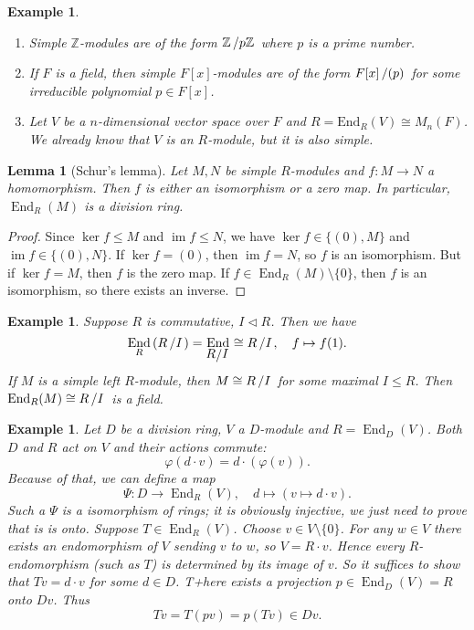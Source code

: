 \documentclass[10pt, a4paper]{article}
\newtheorem{example}[thm]{Example}
\newtheorem{lemma}[thm]{Lemma}
\newenvironment{noticeC}{%
  \tcolorbox[%
  notitle,
  empty,
  enhanced,  %
  breakable,
  coltext=black, 
  fontupper=\rmfamily,
  noparskip,
  sharp corners,
  boxrule=-1pt,  %
  frame hidden,
  left=7pt,  %
  right=7pt,
  top=5pt,
  bottom=5pt,
  before skip=2.5ex plus 2pt,
  after skip=2.5ex plus 2pt,
  overlay unbroken and last={%
  },
  ]}
{\endtcolorbox}
\newenvironment{myproof}%
  {\begin{noticeC}\begin{proof}}%
  {\end{proof}\end{noticeC}}
\newcommand{\Z}{\mathbb {Z}}
\newcommand{\quot}[2]{{\raisebox{0em}{$#1$}\left/\raisebox{0em}{$#2$}\right.}}
\DeclareMathOperator{\im}{im}
\DeclareMathOperator{\en}{End}
\begin{document}
\begin{example}
  \begin{enumerate}
    \item Simple $\Z$-modules are of the form $\quot{\Z}{p\Z}$ where $p$ is a prime number.
    \item If $F$ is a field, then simple $F[x]$-modules are of the form $\quot{F[x]}{(p)}$
    for some irreducible polynomial $p \in F[x]$.
    \item Let $V$ be a $n$-dimensional vector space over $F$ and $R = \mathrm{End}_R (V) \cong M_n (F)$.
    We already know that $V$ is an $R$-module, but it is also simple.
  \end{enumerate}

\end{example}

\begin{lemma}[Schur's lemma]
  Let $M, N$ be simple $R$-modules and $f: M \to N$ a homomorphism. Then $f$ is either an isomorphism or a zero map.
  In particular, $\en_R (M)$ is a division ring.
\end{lemma}

\begin{myproof}
  Since $\ker f \leq M$ and $\im f \leq N$, we have $\ker f \in \{(0), M\}$ and $\im f \in \{(0), N\}$.
  If $\ker f = (0)$, then $\im f = N$, so $f$ is an isomorphism. But if $\ker f = M$, then $f$ is the zero map.
  If $f \in \en_R (M) \setminus \{0\}$, then $f$ is an isomorphism, so there exists an inverse.
\end{myproof}

\begin{example}
    Suppose $R$ is commutative, $I \lhd R$.
    Then we have 
    $$\en_R \left(\quot{R}{I}\right) = \en_{\quot{R}{I}} \cong \quot{R}{I},\quad f \mapsto f(1).$$
    If $M$ is a simple left $R$-module, then $M \cong \quot{R}{I}$ for some maximal $I \leq R$.
    Then $\en_R (M) \cong \quot{R}{I}$ is a field.
\end{example}

\begin{example}
  Let $D$ be a division ring, $V$ a $D$-module and $R = \en_D (V)$.
  Both $D$ and $R$ act on $V$ and their actions commute:
  $$\varphi (d \cdot v) = d \cdot (\varphi (v)).$$
  Because of that, we can define a map
  $$\Psi: D \to \en_R (V),\quad d \mapsto (v \mapsto d \cdot v).$$
  Such a $\Psi$ is a isomorphism of rings; it is obviously injective, we just need to prove that is is onto.
  Suppose $T \in \en_R (V)$. Choose $v \in V \setminus \{0\}$.
  For any $w \in V$ there exists an endomorphism of $V$ sending $v$ to $w$, so $V = R \cdot v$.
  Hence every $R$-endomorphism (such as $T$) is determined by its image of $v$.
  So it suffices to show that $Tv = d \cdot v$ for some $d \in D$.
  T+here exists a projection $p \in \en_D (V) = R$ onto $Dv$. Thus 
  $$Tv = T(pv) = p(Tv) \in Dv.$$
\end{example}
\end{document}
